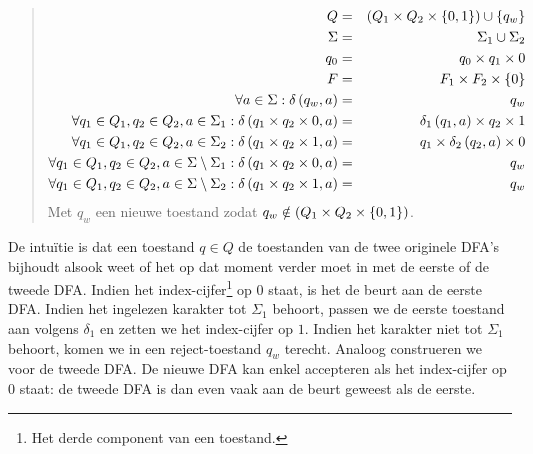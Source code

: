 \documentclass{article}
\begin{document}
\begin{question}
\begin{answer}
\begin{enumerate}
\begin{quote}
\begin{construction}
 \begin{eqnarray}
  Q&=&\left( Q_1\times Q_2\times\left\{ 0,1 \right\} \right)\cup\left\{ q_w \right\}\\
  \Sigma&=&\Sigma_1\cup\Sigma_2\\
  q_0&=&q_0\times q_1\times 0\\
  F&=&F_1\times F_2\times\left\{ 0 \right\}\\
  \forall a\in \Sigma:\delta\left( q_w,a \right)&=&q_w\\
  \forall q_1\in Q_1,q_2\in Q_2,a\in \Sigma_1:\delta\left( q_1\times q_2\times 0,a \right)&=&\delta_1\left( q_1,a \right)\times q_2\times 1\\
  \forall q_1\in Q_1,q_2\in Q_2,a\in \Sigma_2:\delta\left( q_1\times q_2\times 1,a \right)&=&q_1\times\delta_2\left( q_2,a \right)\times 0\\
  \forall q_1\in Q_1,q_2\in Q_2,a\in \Sigma\setminus\Sigma_1:\delta\left( q_1\times q_2\times 0,a \right)&=&q_w\\
  \forall q_1\in Q_1,q_2\in Q_2,a\in \Sigma\setminus\Sigma_2:\delta\left( q_1\times q_2\times 1,a \right)&=&q_w
 \end{eqnarray}
 Met $q_w$ een nieuwe toestand zodat $q_w\notin\left( Q_1\times Q_2\times\left\{ 0,1 \right\} \right)$.
 \end{construction}
 \end{quote}
 De intu\"itie is dat een toestand $q\in Q$ de toestanden van de twee originele DFA's bijhoudt alsook weet of het op dat moment verder moet in met de eerste of de tweede DFA. Indien het index-cijfer\footnote{Het derde component van een toestand.} op $0$ staat, is het de beurt aan de eerste DFA. Indien het ingelezen karakter tot $\Sigma_1$ behoort, passen we de eerste toestand aan volgens $\delta_1$ en zetten we het index-cijfer op $1$. Indien het karakter niet tot $\Sigma_1$ behoort, komen we in een reject-toestand $q_w$ terecht. Analoog construeren we voor de tweede DFA. De nieuwe DFA kan enkel accepteren als het index-cijfer op $0$ staat: de tweede DFA is dan even vaak aan de beurt geweest als de eerste.
\end{enumerate}
\end{answer}
\end{question}
\end{document}
